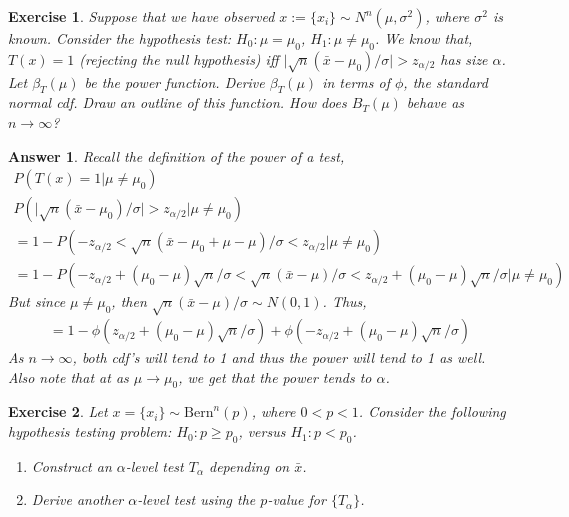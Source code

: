 \documentclass[12pt]{article}
\theoremstyle{colon}
\newtheorem{exercise}{Exercise}
\newtheorem*{answer}{Answer}
\begin{document}
\clearpage

\begin{exercise}
  Suppose that we have observed $x := \{ x_i \} \sim N^n (\mu, \sigma^2)$, where $\sigma^2$ is known. Consider the hypothesis test: $H_0: \mu = \mu_0$, $H_1 : \mu \neq \mu_0$. We know that, $T(x) = 1$ (rejecting the null hypothesis) iff $\lvert \sqrt{n}(\bar{x} - \mu_0)/\sigma \rvert > z_{\alpha/2}$ has size $\alpha$. Let $\beta_T(\mu)$ be the power function. Derive $\beta_T(\mu)$ in terms of $\phi$, the standard normal cdf. Draw an outline of this function. How does $B_T(\mu)$ behave as $n \rightarrow \infty$?
\end{exercise}

\begin{answer}
  Recall the definition of the power of a test,
  \begin{gather*}
    P(T(x) = 1 | \mu \neq \mu_0) \\
    P(\lvert \sqrt{n}(\bar{x} - \mu_0)/\sigma \rvert > z_{\alpha/2} | \mu \neq \mu_0) \\
    = 1 - P( -z_{\alpha/2} < \sqrt{n}(\bar{x} - \mu_0 + \mu - \mu)/\sigma < z_{\alpha/2} | \mu \neq \mu_0) \\
    = 1 - P( -z_{\alpha/2} + (\mu_0-\mu) \sqrt{n}/\sigma < \sqrt{n}(\bar{x} - \mu)/\sigma  < z_{\alpha/2} + (\mu_0-\mu) \sqrt{n}/\sigma | \mu \neq \mu_0)
  \end{gather*}
  But since $\mu \neq \mu_0$, then $\sqrt{n}(\bar{x} - \mu)/\sigma \sim N(0,1)$. Thus,
  \begin{gather*}
    = 1 - \phi(z_{\alpha/2} + (\mu_0-\mu) \sqrt{n}/\sigma) + \phi(-z_{\alpha/2} + (\mu_0-\mu) \sqrt{n}/\sigma)
  \end{gather*}
  As $n \rightarrow \infty$, both cdf's will tend to 1 and thus the power will tend to 1 as well. Also note that at as $\mu \rightarrow \mu_0$, we get that the power tends to $\alpha$.
\end{answer}

\clearpage

\begin{exercise}
  Let $x = \{ x_i \} \sim \text{Bern}^n(p)$, where $0 < p < 1$. Consider the following hypothesis testing problem: $H_0 : p \geq p_0$, versus $H_1 : p < p_0$.
  \begin{enumerate}[label=\arabic*)]
    \item Construct an $\alpha$-level test $T_\alpha$ depending on $\bar{x}$.
    \item Derive another $\alpha$-level test using the $p$-value for $\{ T_\alpha \}$.
  \end{enumerate}
\end{exercise}
\end{document}
